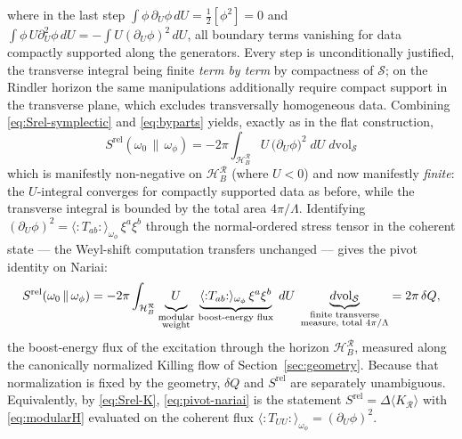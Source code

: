 \documentclass[11pt]{article}
\newcommand{\Srel}{S^{\mathrm{rel}}}
\newcommand{\Nariai}{Nariai}
\begin{document}
where in the last step $\int \phi\,\partial_U\phi\, dU = \tfrac{1}{2}[\phi^2] = 0$ and $\int \phi\, U \partial_U^2\phi\, dU = -\int U (\partial_U\phi)^2\, dU$, all boundary terms vanishing for data compactly supported along the generators. Every step is unconditionally justified, the transverse integral being finite \emph{term by term} by compactness of $\mathcal{S}$; on the Rindler horizon the same manipulations additionally require compact support in the transverse plane, which excludes transversally homogeneous data. Combining \eqref{eq:Srel-symplectic} and \eqref{eq:byparts} yields, exactly as in the flat construction,
\begin{equation}
\boxed{\;
\Srel(\omega_0\,\|\,\omega_\phi)
= -2\pi \int_{\mathcal{H}_B^{\mathcal{R}}} U\, \big(\partial_U \phi\big)^2 \; dU\; d\mathrm{vol}_{\mathcal{S}}
\;}
\label{eq:Srel-nariai}
\end{equation}
which is manifestly non-negative on $\mathcal{H}_B^{\mathcal{R}}$ (where $U < 0$) and now manifestly \emph{finite}: the $U$-integral converges for compactly supported data as before, while the transverse integral is bounded by the total area $4\pi/\Lambda$. Identifying $(\partial_U\phi)^2 = \langle{:}T_{ab}{:}\rangle_{\omega_\phi}\,\xi^a\xi^b$ through the normal-ordered stress tensor in the coherent state --- the Weyl-shift computation transfers unchanged --- gives the pivot identity on \Nariai{}:
\begin{equation}
\Srel(\omega_0\,\|\,\omega_\phi)
= -2\pi \int_{\mathcal{H}_B^{\mathcal{R}}} \underbrace{U\vphantom{\big(}}_{\substack{\text{modular}\\ \text{weight}}}\, \underbrace{\langle{:}T_{ab}{:}\rangle_{\omega_\phi}\, \xi^a \xi^b}_{\text{boost-energy flux}} \; dU\; \underbrace{d\mathrm{vol}_{\mathcal{S}}}_{\substack{\text{finite transverse}\\ \text{measure, total } 4\pi/\Lambda}}
= 2\pi\, \delta Q,
\label{eq:pivot-nariai}
\end{equation}
the boost-energy flux of the excitation through the horizon $\mathcal H_B^{\mathcal R}$, measured along the canonically normalized Killing flow of Section~\ref{sec:geometry}. Because that normalization is fixed by the geometry, $\delta Q$ and $\Srel$ are separately unambiguous. Equivalently, by \eqref{eq:Srel-K}, \eqref{eq:pivot-nariai} is the statement $\Srel = \Delta\langle K_{\mathcal{R}}\rangle$ with \eqref{eq:modularH} evaluated on the coherent flux $\langle{:}T_{UU}{:}\rangle_{\omega_\phi} = (\partial_U\phi)^2$.
\end{document}

